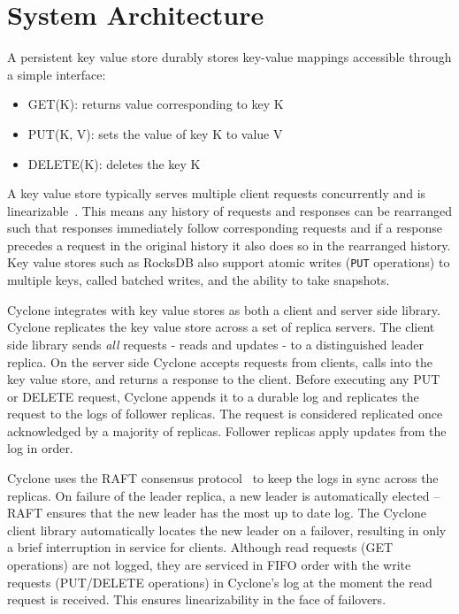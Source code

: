 \documentclass[pageno]{jpaper}
\begin{document}
\section{System Architecture}
\label{sec:sysarch}
A persistent key value store durably stores key-value mappings accessible
through a simple interface:

\begin{itemize}
\item GET(K): returns value corresponding to key K
\item PUT(K, V): sets the value of key K to value V
\item DELETE(K): deletes the key K
\end{itemize}

A key value store typically serves multiple client requests concurrently and is
linearizable~\cite{linearizability}. This means any history of requests and
responses can be rearranged such that responses immediately follow corresponding
requests and if a response precedes a request in the original history it also
does so in the rearranged history. Key value stores such as RocksDB also
support atomic writes ({\tt PUT} operations) to multiple keys, called batched
writes, and the ability to take snapshots.

Cyclone integrates with key value stores as both a client and server side
library. Cyclone replicates the key value store across a set of replica
servers. The client side library sends \emph{all} requests - reads and updates -
to a distinguished leader replica.  On the server side Cyclone accepts requests
from clients, calls into the key value store, and returns a response to the
client. Before executing any PUT or DELETE request, Cyclone appends it to a
durable log and replicates the request to the logs of follower replicas. The
request is considered replicated once acknowledged by a majority of
replicas. Follower replicas apply updates from the log in order.

Cyclone uses the RAFT consensus protocol~\cite{raft} to keep the logs in sync
across the replicas. On failure of the leader replica, a new leader is
automatically elected -- RAFT ensures that the new leader has the most up to
date log. The Cyclone client library automatically locates the new leader on a
failover, resulting in only a brief interruption in service for
clients. Although read requests (GET operations) are not logged, they are
serviced in FIFO order with the write requests (PUT/DELETE operations) in
Cyclone's log at the moment the read request is received. This ensures
linearizability in the face of failovers.
\end{document}
